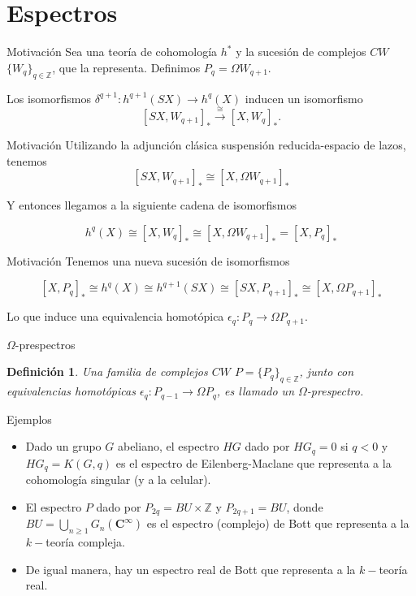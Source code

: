 \documentclass{beamer}
\newtheorem{df}{Definici\'on}
\newcommand{\C}{\mathbf{C}}
\newcommand{\Z}{\mathbb{Z}}
\begin{document}
\section{Espectros}

\begin{frame}{Motivación}
Sea una teor\'ia de cohomolog\'ia $h^{\ast}$ y la sucesi\'on de complejos $CW$ $\{W_{q}\}_{q\in\Z}$, que la representa. Definimos $P_{q}=\Omega W_{q+1}$.

Los isomorfismos $\delta^{q+1}:h^{q+1}(SX)\to h^{q}(X)$ inducen un isomorfismo 
\[[S X,W_{q+1}]_{\ast}\xrightarrow{\cong}[X,W_{q}]_{\ast}.\]
\end{frame}

\begin{frame}{Motivación}
Utilizando la adjunci\'on cl\'asica suspensi\'on reducida-espacio de lazos, tenemos 
\[[SX,W_{q+1}]_{\ast}\cong[X,\Omega W_{q+1}]_{\ast}\]

Y entonces llegamos a la siguiente cadena de isomorfismos

\[h^{q}(X)\cong[X,W_{q}]_{\ast}\cong[X,\Omega W_{q+1}]_{\ast}=[X,P_{q}]_{\ast}\]
\end{frame}

\begin{frame}{Motivación}
Tenemos una nueva sucesi\'on de isomorfismos

\[[X,P_{q}]_{\ast}\cong h^{q}(X)\cong h^{q+1}(SX)\cong[SX,P_{q+1}]_{\ast}\cong[X,\Omega P_{q+1}]_{\ast}\]

Lo que induce una equivalencia homotópica $\epsilon_{q}\colon P_{q}\to\Omega P_{q+1}$.
\end{frame}

\begin{frame}{$\Omega$-prespectros}
\begin{df}
Una familia de complejos $CW$ $P=\{P_{q}\}_{q\in\Z}$, junto con equivalencias homot\'opicas $\epsilon_{q}\colon P_{q-1}\to\Omega P_{q}$, es llamado un $\Omega$-prespectro.
\end{df}
\end{frame}

\begin{frame}{Ejemplos}
	\begin{itemize}
		\item Dado un grupo $G$ abeliano, el espectro $HG$ dado por $HG_q=0$ si $q<0$ y $HG_q = K(G,q)$ es el espectro de Eilenberg-Maclane que representa a la cohomología singular (y a la celular).
		\item El espectro $P$ dado por $P_{2q}=BU\times\Z$ y $P_{2q+1}=BU$, donde $BU=\bigcup_{n\geq1}G_n(\C^\infty)$ es el espectro (complejo) de Bott que representa a la $k-$teoría compleja.
		
		\item De igual manera, hay un espectro real de Bott que representa a la $k-$teoría real.
	\end{itemize}
\end{frame}
\end{document}
